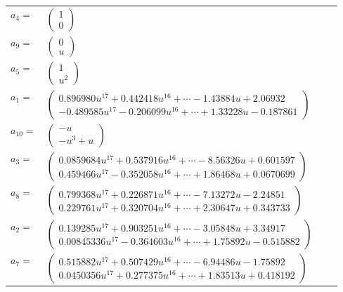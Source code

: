 \documentclass[1p]{elsarticle_modified}
\theoremstyle{definition}
\begin{document}
\begin{tabular}{m{7pt} m{180pt} m{7pt} m{180pt} }
\flushright $a_{4}=$&$\begin{pmatrix}1\\0\end{pmatrix}$ \\
\flushright $a_{9}=$&$\begin{pmatrix}0\\u\end{pmatrix}$ \\
\flushright $a_{5}=$&$\begin{pmatrix}1\\u^2\end{pmatrix}$ \\
\flushright $a_{1}=$&$\begin{pmatrix}0.896980 u^{17}+0.442418 u^{16}+\cdots-1.43884 u+2.06932\\-0.489585 u^{17}-0.206099 u^{16}+\cdots+1.33228 u-0.187861\end{pmatrix}$ \\
\flushright $a_{10}=$&$\begin{pmatrix}- u\\- u^3+u\end{pmatrix}$ \\
\flushright $a_{3}=$&$\begin{pmatrix}0.0859684 u^{17}+0.537916 u^{16}+\cdots-8.56326 u+0.601597\\0.459466 u^{17}-0.352058 u^{16}+\cdots+1.86468 u+0.0670699\end{pmatrix}$ \\
\flushright $a_{8}=$&$\begin{pmatrix}0.799368 u^{17}+0.226871 u^{16}+\cdots-7.13272 u-2.24851\\0.229761 u^{17}+0.320704 u^{16}+\cdots+2.30647 u+0.343733\end{pmatrix}$ \\
\flushright $a_{2}=$&$\begin{pmatrix}0.139285 u^{17}+0.903251 u^{16}+\cdots-3.05848 u+3.34917\\0.00845336 u^{17}-0.364603 u^{16}+\cdots+1.75892 u-0.515882\end{pmatrix}$ \\
\flushright $a_{7}=$&$\begin{pmatrix}0.515882 u^{17}+0.507429 u^{16}+\cdots-6.94486 u-1.75892\\0.0450356 u^{17}+0.277375 u^{16}+\cdots+1.83513 u+0.418192\end{pmatrix}$ \\

\end{tabular}
\end{document}
